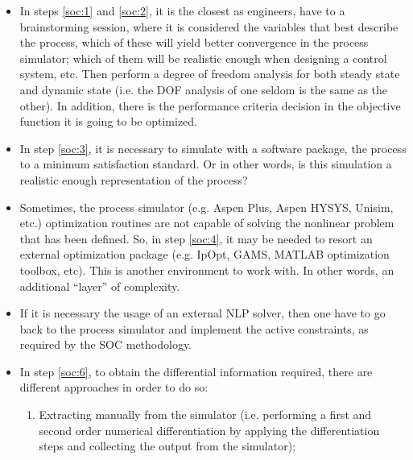 \documentclass[../msc-thesis.tex]{subfiles}
\begin{document}
\begin{itemize}
    \label{soc:mainsteps}

    \item In steps \ref{soc:1} and \ref{soc:2}, it is the closest as 
    engineers, have to a brainstorming session, where it is considered the 
    variables that best describe the process, which of these will yield 
    better convergence in the process simulator; which of them will be 
    realistic enough when designing a control system, etc. Then perform a 
    degree of freedom analysis for both steady state and dynamic state 
    (i.e. the DOF analysis of one seldom is the same as the other). In 
    addition, there is the performance criteria decision in the objective 
    function it is going to be optimized.
    
    \item In step \ref{soc:3}, it is necessary to simulate with a software 
    package, the process to a minimum satisfaction standard. Or in other 
    words, is this simulation a realistic enough representation of the process?
    
    \item Sometimes, the process simulator (e.g. Aspen Plus, Aspen HYSYS, 
    Unisim, etc.) optimization routines are not capable of solving the 
    nonlinear problem that has been defined. So, in step \ref{soc:4}, it may 
    be needed to resort an external optimization package (e.g. IpOpt, GAMS, 
    MATLAB\textsuperscript{\textregistered} optimization toolbox, etc). This 
    is another environment to work with. In other words, an additional 
    ``layer'' of complexity.
    
    \item If it is necessary the usage of an external NLP solver, then one 
    have to go back to the process simulator and implement the active 
    constraints, as required by the SOC methodology.
    
    \item In step \ref{soc:6}, to obtain the differential information 
    required, there are different approaches in order to do so:

    \begin{enumerate}
        \item Extracting manually from the simulator (i.e. performing a 
        first and second order numerical differentiation by applying
        the differentiation steps and collecting the output from the 
        simulator); \label{socdiff:1}
        

\end{enumerate}
\end{itemize}
\end{document}
